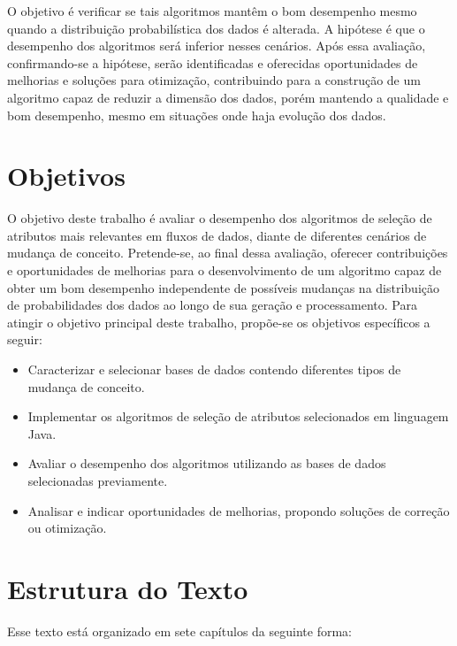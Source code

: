 O objetivo é verificar se tais algoritmos mantêm o bom desempenho mesmo quando a distribuição probabilística dos dados é alterada. A hipótese é que o desempenho dos algoritmos será inferior nesses cenários. Após essa avaliação, confirmando-se a hipótese, serão identificadas e oferecidas oportunidades de melhorias e soluções para otimização, contribuindo para a construção de um algoritmo capaz de reduzir a dimensão dos dados, porém mantendo a qualidade e bom desempenho, mesmo em situações onde haja evolução dos dados.


\section{Objetivos}\label{sec:objetivos} 

O objetivo deste trabalho é avaliar o desempenho dos algoritmos de seleção de atributos mais relevantes  em fluxos de dados, diante de diferentes cenários de mudança de conceito. Pretende-se, ao final dessa avaliação, oferecer contribuições e oportunidades de melhorias para o desenvolvimento de um algoritmo capaz de obter um bom desempenho independente de possíveis mudanças na distribuição de probabilidades
dos dados ao longo de sua geração e processamento. Para atingir o objetivo principal deste trabalho, propõe-se os objetivos específicos a seguir:

\begin{itemize}
\item Caracterizar e selecionar bases de dados contendo diferentes tipos de mudança de conceito.
\item Implementar os algoritmos de seleção de atributos selecionados em linguagem Java.
\item Avaliar o desempenho dos algoritmos utilizando as bases de dados selecionadas previamente.
\item Analisar e indicar oportunidades de melhorias, propondo soluções de correção ou
otimização.
\end{itemize}


\section{Estrutura do Texto}\label{sec:estrutura_texto} 

Esse texto está organizado em sete capítulos da seguinte forma:

